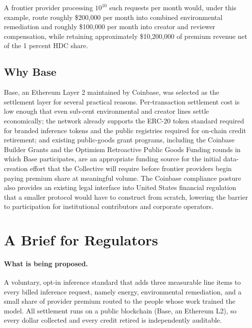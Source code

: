 \documentclass[10pt,a4paper,twocolumn]{article}
\begin{document}
A frontier provider processing $10^{10}$ such requests per month would, under this example, route roughly \$200{,}000 per month into combined environmental remediation and roughly \$100{,}000 per month into creator and reviewer compensation, while retaining approximately \$10{,}200{,}000 of premium revenue net of the 1 percent HDC share.

\subsection*{Why Base}

Base, an Ethereum Layer 2 maintained by Coinbase, was selected as the settlement layer for several practical reasons. Per-transaction settlement cost is low enough that even sub-cent environmental and creator lines settle economically; the network already supports the ERC-20 token standard required for branded inference tokens and the public registries required for on-chain credit retirement; and existing public-goods grant programs, including the Coinbase Builder Grants and the Optimism Retroactive Public Goods Funding rounds in which Base participates, are an appropriate funding source for the initial data-creation effort that the Collective will require before frontier providers begin paying premium share at meaningful volume. The Coinbase compliance posture also provides an existing legal interface into United States financial regulation that a smaller protocol would have to construct from scratch, lowering the barrier to participation for institutional contributors and corporate operators.

\section{A Brief for Regulators}
\label{sec:appendix-regulators}

\paragraph{What is being proposed.} A voluntary, opt-in inference standard that adds three measurable line items to every billed inference request, namely energy, environmental remediation, and a small share of provider premium routed to the people whose work trained the model. All settlement runs on a public blockchain (Base, an Ethereum L2), so every dollar collected and every credit retired is independently auditable.
\end{document}
